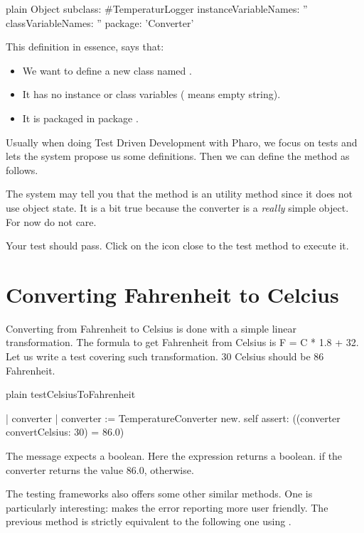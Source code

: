 \documentclass[10pt,twoside,english]{_support/latex/sbabook/sbabook}
\begin{document}
\begin{displaycode}{plain}
Object subclass: #TemperaturLogger
    instanceVariableNames: ''
    classVariableNames: ''
    package: 'Converter'
\end{displaycode}

This definition in essence, says that:

\begin{itemize}
\item We want to define a new class named .
\item It has no instance or class variables ( means empty string).
\item It is packaged in package .
\end{itemize}

Usually when doing Test Driven Development with Pharo, we focus on tests and lets the system propose us some definitions.
Then we can define the method as follows.

The system may tell you that the method is an utility method since it does not use object state.
It is a bit true because the converter is a \textit{really} simple object. For now do not care.

Your test should pass. Click on the icon close to the test method to execute it.
\section{Converting Fahrenheit to Celcius}
Converting from Fahrenheit to Celsius is done with a simple linear transformation.
The formula to get Fahrenheit from Celsius is F = C * 1.8 + 32.
Let us write a test covering such transformation. 30 Celsius should be 86 Fahrenheit.

\begin{displaycode}{plain}
testCelsiusToFahrenheit

    | converter |
    converter := TemperatureConverter new.
    self assert: ((converter convertCelsius: 30) = 86.0)
\end{displaycode}

The message  expects a boolean. Here the expression  returns a boolean.  if the converter returns the value 86.0,  otherwise.

The testing frameworks also offers some other similar methods. One is particularly interesting:  makes the error reporting more user friendly. The previous method is strictly equivalent to the following one using .
\end{document}
